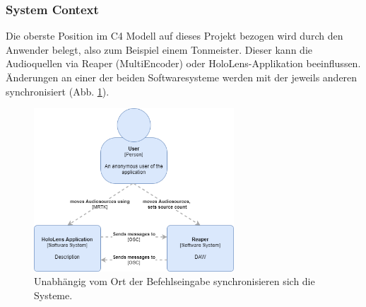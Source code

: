 \documentclass[11pt, titlepage, fleqn]{report}
\begin{document}
				\newpage
                \subsubsection*{System Context}
                    Die oberste Position im C4 Modell auf dieses Projekt bezogen wird durch den Anwender belegt, also zum Beispiel einem 
                    Tonmeister. Dieser kann die Audioquellen via Reaper (MultiEncoder) oder HoloLens-Applikation beeinflussen. 
                    Änderungen an einer der beiden Softwaresysteme werden mit 
                    der jeweils anderen synchronisiert (Abb. 
                    \ref{fig:systemContext}).
                    \begin{figure}[htbp]
                        \centering
                        \includegraphics[width=7.5cm]{./img/systemContext.png}
                        \caption[C4 Modell - System Context]{Unabhängig vom Ort der Befehlseingabe synchronisieren sich die Systeme.\label{fig:systemContext}}
                    \end{figure}
\end{document}

